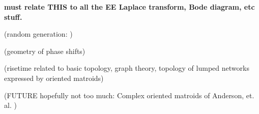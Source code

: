 \documentclass{article}
\begin{document}
\noindent\textbf{must relate THIS to all the EE Laplace transform, 
Bode diagram, etc stuff.}

(random generation: \cite{BoltzmanSampRandCombGen})

(geometry of phase shifts)

(risetime related to basic topology, graph theory, topology of lumped
networks expressed by oriented matroids)

(FUTURE hopefully not too much: Complex oriented matroids of Anderson, et.
al. \cite{complexOM})




{}

\end{document}

